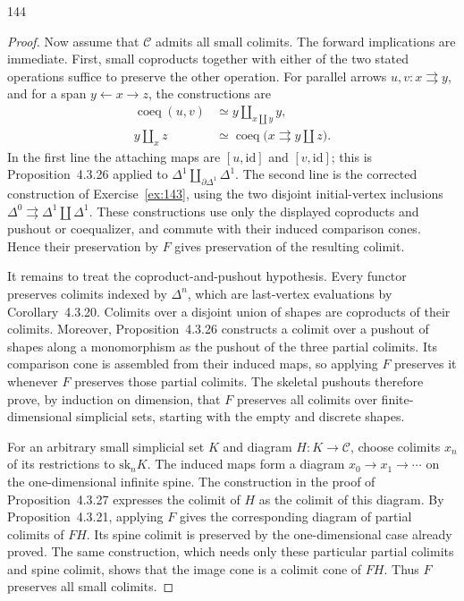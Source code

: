 \begin{exercise}{144}
\begin{proof}
Now assume that $\mathcal C$ admits all small colimits.
The forward implications are immediate.
First, small coproducts together with either of the two stated
operations suffice to preserve the other operation.
For parallel arrows $u,v\colon x\rightrightarrows y$, and for a span
$y\leftarrow x\to z$, the constructions are
\[
 \begin{aligned}
 \operatorname{coeq}(u,v)&\simeq y\amalg_{x\amalg y}y,\\
 y\amalg_x z&\simeq
       \operatorname{coeq}\bigl(x\rightrightarrows y\amalg z\bigr).
 \end{aligned}
\]
In the first line the attaching maps are $[u,\mathrm{id}]$ and
$[v,\mathrm{id}]$; this is Proposition~4.3.26 applied to
$\Delta^1\amalg_{\partial\Delta^1}\Delta^1$.
The second line is the corrected construction of Exercise~\ref{ex:143},
using the two disjoint initial-vertex inclusions
$\Delta^0\rightrightarrows\Delta^1\amalg\Delta^1$.
These constructions use only the displayed coproducts and pushout or
coequalizer, and commute with their induced comparison cones.
Hence their preservation by $F$ gives preservation of the resulting colimit.

It remains to treat the coproduct-and-pushout hypothesis.
Every functor preserves colimits indexed by $\Delta^n$, which are
last-vertex evaluations by Corollary~4.3.20.
Colimits over a disjoint union of shapes are coproducts of their colimits.
Moreover, Proposition~4.3.26 constructs a colimit over a pushout of
shapes along a monomorphism as the pushout of the three partial colimits.
Its comparison cone is assembled from their induced maps, so applying
$F$ preserves it whenever $F$ preserves those partial colimits.
The skeletal pushouts therefore prove, by induction on dimension,
that $F$ preserves all colimits over finite-dimensional simplicial sets,
starting with the empty and discrete shapes.

For an arbitrary small simplicial set $K$ and diagram $H\colon K\to\mathcal C$,
choose colimits $x_n$ of its restrictions to $\mathrm{sk}_nK$.
The induced maps form a diagram $x_0\to x_1\to\cdots$ on the
one-dimensional infinite spine.
The construction in the proof of Proposition~4.3.27 expresses the
colimit of $H$ as the colimit of this diagram.
By Proposition~4.3.21, applying $F$ gives the corresponding diagram
of partial colimits of $FH$.
Its spine colimit is preserved by the one-dimensional case already proved.
The same construction, which needs only these particular partial colimits
and spine colimit, shows that the image cone is a colimit cone of $FH$.
Thus $F$ preserves all small colimits.
\end{proof}
\end{exercise}

